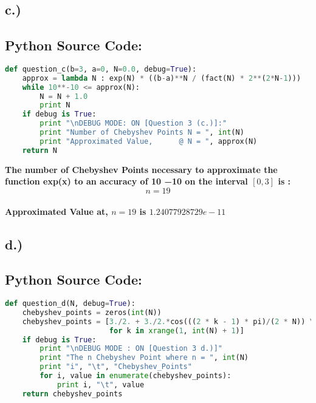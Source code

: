 \documentclass{article}
\begin{document}
\subsection*{c.)}
\subsection*{Python Source Code:}
\begin{lstlisting}[language=Python]
def question_c(b=3, a=0, N=0.0, debug=True):
    approx = lambda N : exp(N) * ((b-a)**N / (fact(N) * 2**(2*N-1)))
    while 10**-10 <= approx(N):
        N = N + 1.0
        print N
    if debug is True:
        print "\nDEBUG MODE: ON [Question 3 (c.)]:"
        print "Number of Chebyshev Points N = ", int(N)
        print "Approximated Value,      @ N = ", approx(N)
    return N
\end{lstlisting}

\textbf{The number of Chebyshev Points necessary to approximate the function exp(x) to an accuracy of 10 −10 on the interval $[0, 3]$ is :\\
\[n = 19\] \\ Approximated Value at,  $n = 19 $ is $ 1.24077928729e-11$}


\pagebreak

\subsection*{d.)}
\subsection*{Python Source Code:}
\begin{lstlisting}[language=Python]
def question_d(N, debug=True):
    chebyshev_points = zeros(int(N))
    chebyshev_points = [3./2. + 3./2.*cos(((2 * k - 1) * pi)/(2 * N)) \
                        for k in xrange(1, int(N) + 1)]
    if debug is True:
        print "\nDEBUG MODE : ON [Question 3 d.)]"
        print "The n Chebyshev Point where n = ", int(N)
        print "i", "\t", "Chebyshev_Points"
        for i, value in enumerate(chebyshev_points):
            print i, "\t", value
    return chebyshev_points
\end{lstlisting}
\end{document}

